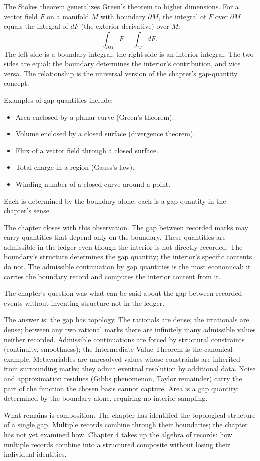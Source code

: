 The Stokes theorem generalizes Green's theorem to higher
dimensions. For a vector field $F$ on a manifold $M$ with boundary
$\partial M$, the integral of $F$ over $\partial M$ equals the
integral of $dF$ (the exterior derivative) over $M$:
\[
\int_{\partial M} F = \int_M dF.
\]
The left side is a boundary integral; the right side is an interior
integral. The two sides are equal: the boundary determines the
interior's contribution, and vice versa. The relationship is the
universal version of the chapter's gap-quantity concept.

Examples of gap quantities include:
\begin{itemize}
\item Area enclosed by a planar curve (Green's theorem).
\item Volume enclosed by a closed surface (divergence theorem).
\item Flux of a vector field through a closed surface.
\item Total charge in a region (Gauss's law).
\item Winding number of a closed curve around a point.
\end{itemize}
Each is determined by the boundary alone; each is a gap quantity in
the chapter's sense.

The chapter closes with this observation. The gap between recorded
marks may carry quantities that depend only on the boundary. These
quantities are admissible in the ledger even though the interior is
not directly recorded. The boundary's structure determines the gap
quantity; the interior's specific contents do not. The admissible
continuation by gap quantities is the most economical: it carries
the boundary record and computes the interior content from it.

\begin{bridge}

The chapter's question was what can be said about the gap between
recorded events without inventing structure not in the ledger.

The answer is: the gap has topology. The rationals are dense; the
irrationals are dense; between any two rational marks there are
infinitely many admissible values neither recorded. Admissible
continuations are forced by structural constraints (continuity,
smoothness); the Intermediate Value Theorem is the canonical
example. Metavariables are unresolved values whose constraints
are inherited from surrounding marks; they admit eventual
resolution by additional data. Noise and approximation residues
(Gibbs phenomenon, Taylor remainder) carry the part of the
function the chosen basis cannot capture. Area is a gap quantity:
determined by the boundary alone, requiring no interior sampling.

What remains is composition. The chapter has identified the
topological structure of a single gap. Multiple records combine
through their boundaries; the chapter has not yet examined how.
Chapter 4 takes up the algebra of records: how multiple records
combine into a structured composite without losing their
individual identities.

\end{bridge}

